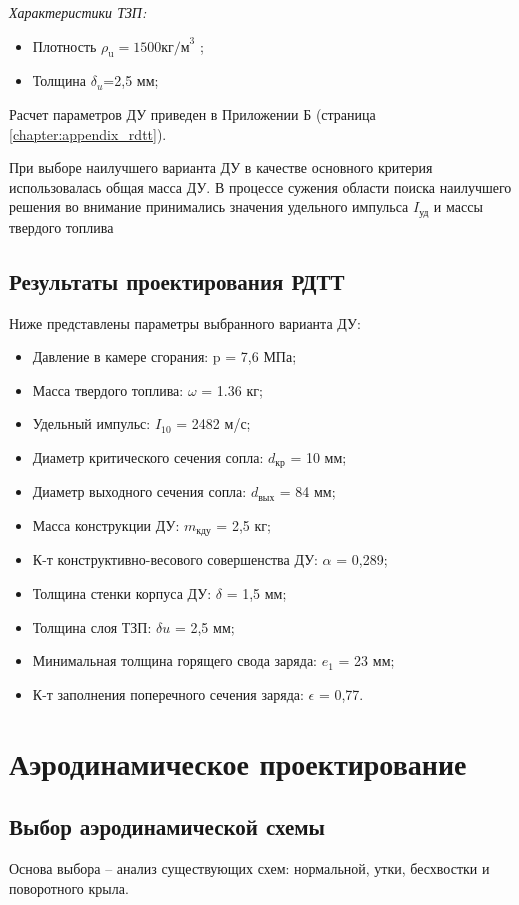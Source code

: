 \emph{Характеристики ТЗП:}

\begin{itemize}
	\item Плотность $\rho_\text{u}=1500  \text{кг/м}^3$ ;
	\item Толщина $\delta_u$=2,5 мм;
\end{itemize}

Расчет параметров ДУ приведен в Приложении Б (страница \ref{chapter:appendix_rdtt}).

При выборе наилучшего варианта ДУ в качестве основного критерия использовалась общая масса ДУ. В процессе сужения области поиска наилучшего решения во внимание принимались значения удельного импульса $I_{\text{уд}}$ и массы твердого топлива

\subsection{Результаты проектирования РДТТ}
Ниже представлены параметры выбранного варианта ДУ:
\begin{itemize}
	\item Давление в камере сгорания:				p = 7,6 МПа;
	\item Масса твердого топлива:					$\omega$ = 1.36 кг; 
	\item Удельный импульс:						$I_{10}$ = 2482 м/с; 
	\item Диаметр критического сечения сопла:			$d_{\text{кр}}$ = 10  мм; 
	\item Диаметр выходного сечения сопла:				$d_{\text{вых}}$ = 84 мм;
	\item Масса конструкции ДУ:					$m_{\text{кду}}$ = 2,5 кг; 
	\item К-т конструктивно-весового совершенства ДУ:		$\alpha$ = 0,289; 
	\item Толщина стенки корпуса ДУ:					$\delta$ = 1,5 мм; 
	\item Толщина слоя ТЗП:						$\delta u$ = 2,5 мм; 
	\item Минимальная толщина горящего свода заряда:		$e_1$ = 23 мм;
	\item К-т заполнения поперечного сечения заряда:		$\epsilon$ = 0,77.
\end{itemize}


\clearpage
\section{Аэродинамическое проектирование}
\subsection{Выбор аэродинамической схемы}
Основа выбора – анализ существующих схем: нормальной, утки, бесхвостки и поворотного крыла.

